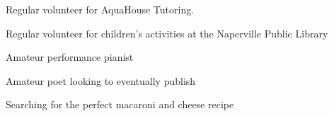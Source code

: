 \documentclass[10.5pt, letterpaper]{article}
\begin{document}
\begin{center}
	\begin{multicols}{2}
		\begin{description}
			\item Regular volunteer for AquaHouse Tutoring.  
			\item Regular volunteer for children's activities at the Naperville Public Library
			\item Amateur performance pianist
			\item Amateur poet looking to eventually publish
			\item Searching for the perfect macaroni and cheese recipe
		\end{description}
	\end{multicols}
\end{center}
\end{document}
